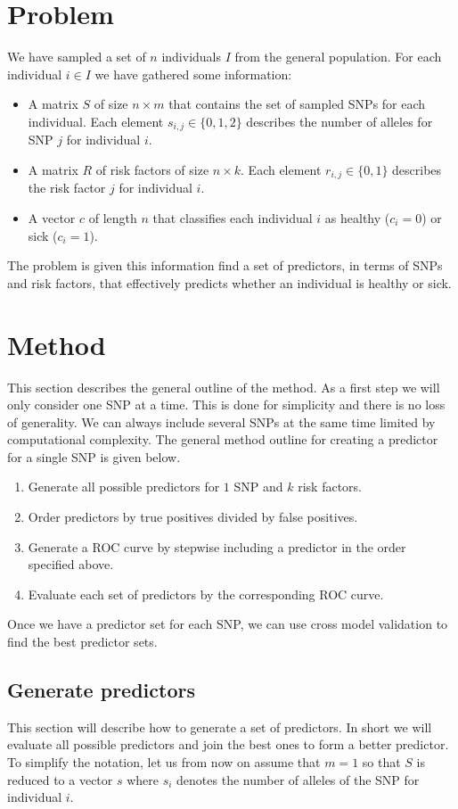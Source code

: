 \documentclass[a4paper]{article}
\begin{document}
\section{Problem}
We have sampled a set of $n$ individuals $I$ from the general population. For each individual $i \in I$ we have gathered some information:
\begin{itemize}
  \item A matrix $S$ of size $n \times m$ that contains the set of sampled SNPs for each individual. Each element $s_{i,j} \in \{0,1,2\}$ describes the number of alleles for SNP $j$ for individual $i$.
  \item A matrix $R$ of risk factors of size $n \times k$. Each element $r_{i,j} \in \{0,1\}$ describes the risk factor $j$ for individual $i$.
  \item A vector $c$ of length $n$ that classifies each individual $i$ as healthy ($c_i = 0$) or sick ($c_i = 1$).
\end{itemize}
The problem is given this information find a set of predictors, in terms of SNPs and risk factors, that effectively predicts whether an individual is healthy or sick.
\section{Method}
This section describes the general outline of the method. As a first step we will only consider one SNP at a time. This is done for simplicity and there is no loss of generality. We can always include several SNPs at the same time limited by computational complexity. The general method outline for creating a predictor for a single SNP is given below.
\begin{enumerate}
  \item Generate all possible predictors for $1$ SNP and $k$ risk factors.
  \item Order predictors by true positives divided by false positives.
  \item Generate a ROC curve by stepwise including a predictor in the order specified above.
  \item Evaluate each set of predictors by the corresponding ROC curve.
\end{enumerate}
Once we have a predictor set for each SNP, we can use cross model validation to find the best predictor sets.

\subsection{Generate predictors}
This section will describe how to generate a set of predictors. In short we will evaluate all possible predictors and join the best ones to form a better predictor. To simplify the notation, let us from now on assume that $m = 1$ so that $S$ is reduced to a vector $s$ where $s_i$ denotes the number of alleles of the SNP for individual $i$.
\end{document}
